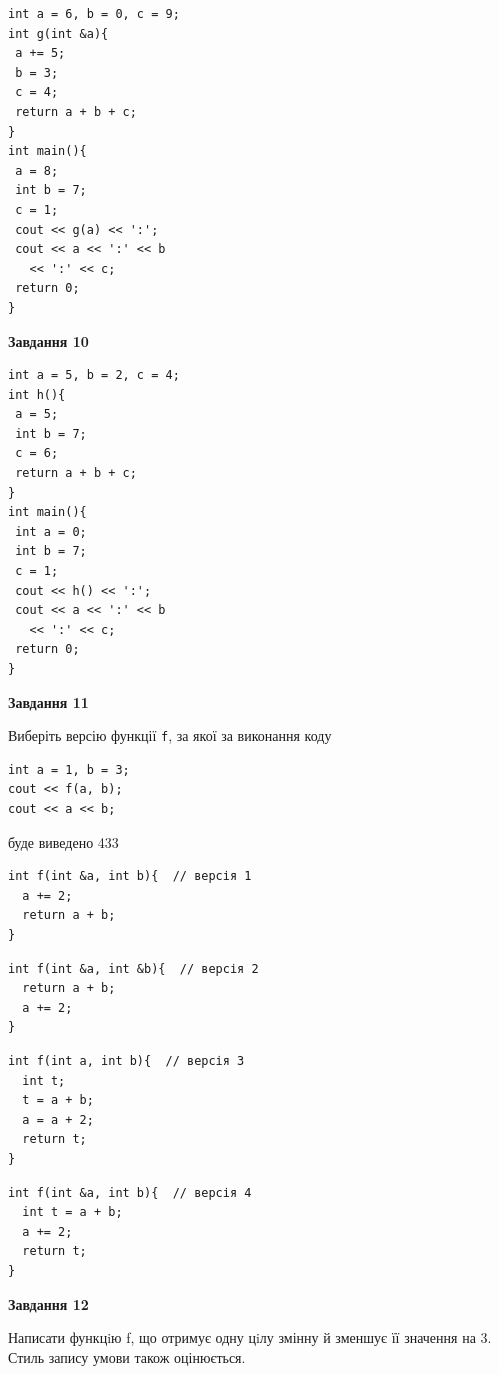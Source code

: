 \documentclass[12pt, ukrainian]{article}
\def\code#1{\Verb!#1!}
\begin{document}
{\begin {large}
\begin{minipage}[t]{7.0cm}
\begin{verbatim}
int a = 6, b = 0, c = 9;
int g(int &a){
 a += 5;
 b = 3;
 c = 4;
 return a + b + c;
}
int main(){
 a = 8;
 int b = 7;
 c = 1;
 cout << g(a) << ':';
 cout << a << ':' << b 
   << ':' << c;
 return 0;
}
\end{verbatim}



\begin{center}
\textbf{Завдання 10}
\end{center}
\vspace{-8mm}

\begin{verbatim}
int a = 5, b = 2, c = 4;
int h(){
 a = 5;
 int b = 7;
 c = 6;
 return a + b + c;
}
int main(){
 int a = 0;
 int b = 7;
 c = 1;
 cout << h() << ':';
 cout << a << ':' << b 
   << ':' << c;
 return 0;
}
\end{verbatim}

\end{minipage}
\vline \hspace{1mm}
\begin{minipage}[t]{11.0cm}

\begin{center}
\textbf{Завдання 11}
\end{center}
Виберіть версію функції \code{f}, за якої за виконання коду
\begin{verbatim}
int a = 1, b = 3;
cout << f(a, b);
cout << a << b;
\end{verbatim}

буде виведено 433

\begin{verbatim}
int f(int &a, int b){  // версія 1
  a += 2;
  return a + b;
}
\end{verbatim}

\vspace{-8mm}\begin{verbatim}
int f(int &a, int &b){  // версія 2
  return a + b;
  a += 2;
}
\end{verbatim}

\vspace{-8mm}\begin{verbatim}
int f(int a, int b){  // версія 3
  int t;
  t = a + b;
  a = a + 2;
  return t;
}
\end{verbatim}

\vspace{-8mm}\begin{verbatim}
int f(int &a, int b){  // версія 4
  int t = a + b;
  a += 2;
  return t;
}
\end{verbatim}



\begin{center}
\textbf{Завдання 12}
\end{center}

Написати функцiю f, що отримує одну цiлу змінну й зменшує її значення на 3. Стиль запису умови також оцінюється.\par

\end{minipage}

\end {large}}
\newpage
\end{document}
